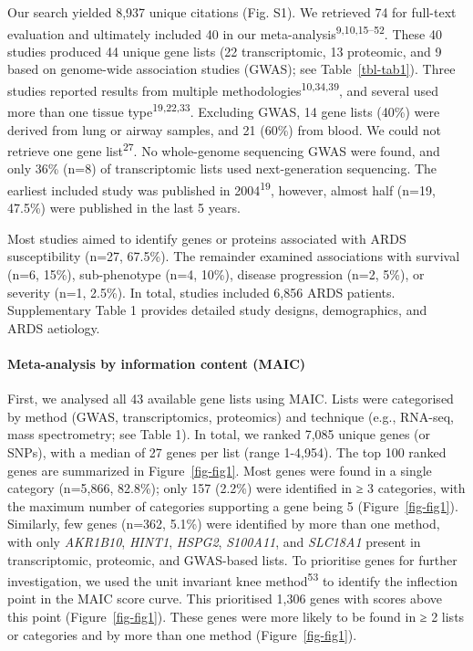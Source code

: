 \documentclass[
  11,
  a4paper,
]{article}
\let\oldparagraph\paragraph
\renewcommand{\paragraph}[1]{\oldparagraph{#1}\mbox{}}
\begin{document}
Our search yielded 8,937 unique citations (Fig. S1). We retrieved 74 for
full-text evaluation and ultimately included 40 in our
meta-analysis\textsuperscript{9,10,15--52}. These 40 studies produced 44
unique gene lists (22 transcriptomic, 13 proteomic, and 9 based on
genome-wide association studies (GWAS); see Table~\ref{tbl-tab1}). Three
studies reported results from multiple
methodologies\textsuperscript{10,34,39}, and several used more than one
tissue type\textsuperscript{19,22,33}. Excluding GWAS, 14 gene lists
(40\%) were derived from lung or airway samples, and 21 (60\%) from
blood. We could not retrieve one gene list\textsuperscript{27}. No
whole-genome sequencing GWAS were found, and only 36\% (n=8) of
transcriptomic lists used next-generation sequencing. The earliest
included study was published in 2004\textsuperscript{19}, however,
almost half (n=19, 47.5\%) were published in the last 5 years.

Most studies aimed to identify genes or proteins associated with ARDS
susceptibility (n=27, 67.5\%). The remainder examined associations with
survival (n=6, 15\%), sub-phenotype (n=4, 10\%), disease progression
(n=2, 5\%), or severity (n=1, 2.5\%). In total, studies included 6,856
ARDS patients. Supplementary Table 1 provides detailed study designs,
demographics, and ARDS aetiology.

\hypertarget{meta-analysis-by-information-content-maic}{%
\paragraph{Meta-analysis by information content
(MAIC)}\label{meta-analysis-by-information-content-maic}}

First, we analysed all 43 available gene lists using MAIC. Lists were
categorised by method (GWAS, transcriptomics, proteomics) and technique
(e.g., RNA-seq, mass spectrometry; see Table 1). In total, we ranked
7,085 unique genes (or SNPs), with a median of 27 genes per list (range
1-4,954). The top 100 ranked genes are summarized in
Figure~\ref{fig-fig1}. Most genes were found in a single category
(n=5,866, 82.8\%); only 157 (2.2\%) were identified in ≥ 3 categories,
with the maximum number of categories supporting a gene being 5
(Figure~\ref{fig-fig1}). Similarly, few genes (n=362, 5.1\%) were
identified by more than one method, with only \emph{AKR1B10},
\emph{HINT1}, \emph{HSPG2}, \emph{S100A11}, and \emph{SLC18A1} present
in transcriptomic, proteomic, and GWAS-based lists. To prioritise genes
for further investigation, we used the unit invariant knee
method\textsuperscript{53} to identify the inflection point in the MAIC
score curve. This prioritised 1,306 genes with scores above this point
(Figure~\ref{fig-fig1}). These genes were more likely to be found in ≥ 2
lists or categories and by more than one method (Figure~\ref{fig-fig1}).
\end{document}
